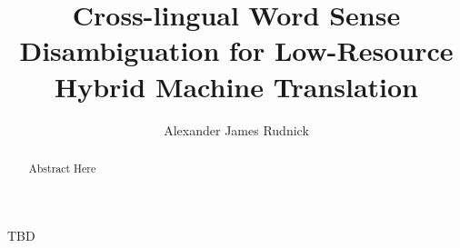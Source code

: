 \documentclass{iuthesis}
\title{Cross-lingual Word Sense Disambiguation for Low-Resource Hybrid Machine
Translation}
\author{Alexander James Rudnick}
\begin{document}
\frontmatter

\begin{acknowledgements}
TBD
\end{acknowledgements}

\begin{abstract}
Abstract Here
\end{abstract}

\maketitle
\signaturepage
\copyrightpage
\makededication
\makeabstract
\tableofcontents

\mainmatter













\printindex
\end{document}

